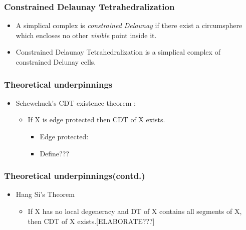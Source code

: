 \documentclass{beamer}
\begin{document}
	\begin{frame}
		\frametitle{Constrained Delaunay Tetrahedralization}
			\begin{itemize}
				\item A simplical complex is \textit{constrained Delaunay} if there exist a circumsphere which encloses no other \textit{visible} point inside it.
				\item Constrained Delaunay Tetrahedralization is a simplical complex of constrained Delunay cells.
			\end{itemize}
	\end{frame}	
	\begin{frame}
		\frametitle{Theoretical underpinnings}
			\begin{itemize}
				\item	Schewchuck's CDT existence theorem \cite{schewCDTExistence}:
					\begin{itemize}
						\item If X is edge protected then CDT of X exists.	
							\begin{itemize}
								\item Edge protected:
									\item Define???
							\end{itemize}		
					\end{itemize}	
			\end{itemize}
	\end{frame}				
	\begin{frame}	
		\frametitle{Theoretical underpinnings(contd.)}
			\begin{itemize}
				\item	Hang Si's Theorem \cite{hangSiMeshingPLCByCDT}
					\begin{itemize}
						\item If X has no local degeneracy and DT of X contains all segments of X, then CDT of X exists.[ELABORATE???] 
					\end{itemize}		
			\end{itemize}		
	\end{frame}	
\end{document}
